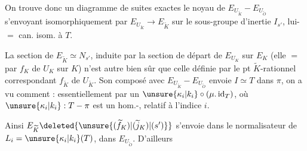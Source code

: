 On trouve donc un diagramme de suites exactes
le noyau  de $E_{U_{\widetilde K}}-E_{U_{\widetilde O}}$ s'envoyant isomorphiquement par $E_{U_{\widetilde K}}\longrightarrow E_{\widetilde K}$ sur le sous-groupe d'inertie $I_{s'}$, lui-$=$ can. isom. à $T$.

La section de  $E_{\widetilde K}\simeq N_{s'}$, induite par la section de départ de $E_{U_K}$ sur $E_K$ (elle $=$  par  $f_K$ de $U_K$ sur $K$) n'est autre bien sûr que celle définie par le pt $\widetilde K$-rationnel correspondant $f_{\widetilde K}$ de $U_{\widetilde K}$. Son composé avec $E_{U_{\widetilde K}}-E_{U_{\widetilde O}}$ envoie $I\simeq T$ dans $\pi$, on a vu comment : essentiellement par un $\unsure{\kappa_i|k_i}\circ(\mu.\operatorname{id}_T)$, où $\unsure{\kappa_i|k_i}:T-\pi$ est un hom.-, relatif à l'indice $i$.

Ainsi  $E_{\widetilde K}\deleted{\unsure{(\widetilde f_K)|(\widetilde j_K)|(s')}}$ s'envoie dans le normalisateur de $L_i=\unsure{\kappa_i|k_i}(T)$, dans $E_{U_{\widetilde O}}$. D'ailleurs
